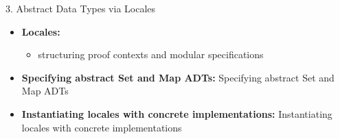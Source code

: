 \documentclass[compress,10pt,xcolor=dvipsnames]{beamer}
\begin{document}
\begin{frame}{3. Abstract Data Types via Locales}

\begin{itemize}
  \item \textbf{Locales:}
    \begin{itemize}
      \item structuring proof contexts and modular specifications
    \end{itemize}
  \item \textbf{Specifying abstract Set and Map ADTs:} Specifying abstract Set and Map ADTs
  \item \textbf{Instantiating locales with concrete implementations:} Instantiating locales with concrete implementations
\end{itemize}
\end{frame}
\end{document}
